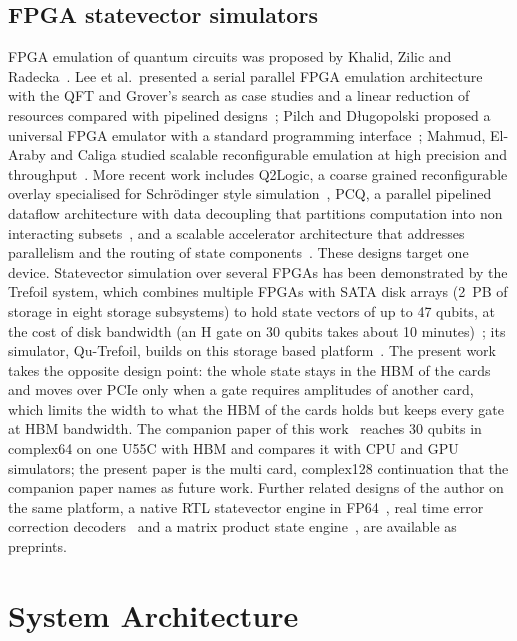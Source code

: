 \documentclass[pdflatex,sn-mathphys-num]{sn-jnl}
\theoremstyle{thmstyleone}
\theoremstyle{thmstylethree}
\begin{document}
\subsection{FPGA statevector simulators}\label{subsec:related-fpga}

FPGA emulation of quantum circuits was proposed by Khalid, Zilic and Radecka~\cite{khalid2004fpga}. Lee et al.\
presented a serial parallel FPGA emulation architecture with the QFT and Grover's search as case studies and a linear
reduction of resources compared with pipelined designs~\cite{lee2016fpga}; Pilch and D\l{}ugopolski proposed a
universal FPGA emulator with a standard programming interface~\cite{pilch2019fpga}; Mahmud, El-Araby and Caliga
studied scalable reconfigurable emulation at high precision and throughput~\cite{mahmud2019scaling}. More recent work
includes Q2Logic, a coarse grained reconfigurable overlay specialised for Schr\"odinger style
simulation~\cite{podobas2023q2logic}, PCQ, a parallel pipelined dataflow architecture with data decoupling that
partitions computation into non interacting subsets~\cite{pcq2024}, and a scalable accelerator architecture that
addresses parallelism and the routing of state components~\cite{belfore2024scalable}. These designs target one
device. Statevector simulation over several FPGAs has been demonstrated by the Trefoil system, which combines
multiple FPGAs with SATA disk arrays (2~PB of storage in eight storage subsystems) to hold state vectors of up to 47
qubits, at the cost of disk bandwidth (an H gate on 30 qubits takes about 10 minutes)~\cite{niwase2023trefoil}; its
simulator, Qu-Trefoil, builds on this storage based platform~\cite{wei2025qutrefoil}. The present work takes the
opposite design point: the whole state stays in the HBM of the cards and moves over PCIe only when a gate requires
amplitudes of another card, which limits the width to what the HBM of the cards holds but keeps every gate at HBM
bandwidth. The companion paper of this work~\cite{tiwari2026fpga30} reaches 30 qubits in complex64 on one U55C with HBM and
compares it with CPU and GPU simulators; the present paper is the multi card, complex128 continuation that the
companion paper names as future work. Further related designs of the author on the same platform, a native RTL
statevector engine in FP64~\cite{ali2026rtl}, real time error correction decoders~\cite{ali2026qec} and a matrix
product state engine~\cite{ali2026mps}, are available as preprints.
\section{System Architecture}\label{sec:architecture}
\end{document}
